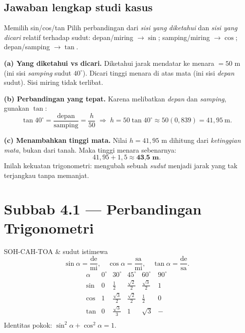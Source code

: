 \subsection*{Jawaban lengkap studi kasus}

\begin{ingat}{Memilih sin/cos/tan}
Pilih perbandingan dari \emph{sisi yang diketahui} dan \emph{sisi yang dicari}
relatif terhadap sudut: depan/miring $\to\sin$; samping/miring $\to\cos$;
depan/samping $\to\tan$.
\end{ingat}

\textbf{(a) Yang diketahui vs dicari.} Diketahui jarak mendatar ke menara $=50$ m
(ini sisi \emph{samping} sudut $40^\circ$). Dicari tinggi menara di atas mata
(ini sisi \emph{depan} sudut). Sisi miring tidak terlibat.

\textbf{(b) Perbandingan yang tepat.} Karena melibatkan \emph{depan} dan
\emph{samping}, gunakan $\tan$:
\[
\tan40^\circ=\frac{\text{depan}}{\text{samping}}=\frac{h}{50}
\;\Rightarrow\; h=50\tan40^\circ\approx50(0{,}839)=41{,}95\ \text{m}.
\]

\textbf{(c) Menambahkan tinggi mata.} Nilai $h=41{,}95$ m dihitung dari
\emph{ketinggian mata}, bukan dari tanah. Maka tinggi menara sebenarnya:
\[
41{,}95 + 1{,}5 \approx \textbf{43{,}5 m}.
\]
Inilah kekuatan trigonometri: mengubah sebuah \emph{sudut} menjadi jarak yang
tak terjangkau tanpa memanjat.

\section*{Subbab 4.1 — Perbandingan Trigonometri}

\begin{ingat}{SOH-CAH-TOA \& sudut istimewa}
\[
\sin\alpha=\frac{\text{de}}{\text{mi}},\quad
\cos\alpha=\frac{\text{sa}}{\text{mi}},\quad
\tan\alpha=\frac{\text{de}}{\text{sa}}.
\]
\[
\begin{array}{c|ccccc}
\alpha & 0^\circ & 30^\circ & 45^\circ & 60^\circ & 90^\circ\\\hline
\sin & 0 & \frac12 & \frac{\sqrt2}{2} & \frac{\sqrt3}{2} & 1\\[3pt]
\cos & 1 & \frac{\sqrt3}{2} & \frac{\sqrt2}{2} & \frac12 & 0\\[3pt]
\tan & 0 & \frac{\sqrt3}{3} & 1 & \sqrt3 & -\\
\end{array}
\]
Identitas pokok: $\sin^2\alpha+\cos^2\alpha=1$.
\end{ingat}

